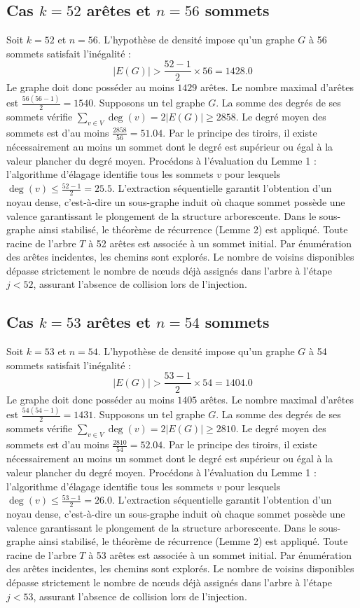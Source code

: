 \documentclass[12pt,a4paper]{article}
\begin{document}
\subsection{Cas $k = 52$ arêtes et $n = 56$ sommets}
Soit $k = 52$ et $n = 56$. L'hypothèse de densité impose qu'un graphe $G$ à 56 sommets satisfait l'inégalité :
$$ |E(G)| > \frac{52-1}{2} \times 56 = 1428.0 $$
Le graphe doit donc posséder au moins $1429$ arêtes. Le nombre maximal d'arêtes est $\frac{56(56-1)}{2} = 1540$.
Supposons un tel graphe $G$. La somme des degrés de ses sommets vérifie $\sum_{v \in V} \deg(v) = 2|E(G)| \geq 2858$.
Le degré moyen des sommets est d'au moins $\frac{2858}{56} = 51.04$.
Par le principe des tiroirs, il existe nécessairement au moins un sommet dont le degré est supérieur ou égal à la valeur plancher du degré moyen.
Procédons à l'évaluation du Lemme 1 : l'algorithme d'élagage identifie tous les sommets $v$ pour lesquels $\deg(v) \leq \frac{52-1}{2} = 25.5$.
L'extraction séquentielle garantit l'obtention d'un noyau dense, c'est-à-dire un sous-graphe induit où chaque sommet possède une valence garantissant le plongement de la structure arborescente.
Dans le sous-graphe ainsi stabilisé, le théorème de récurrence (Lemme 2) est appliqué. Toute racine de l'arbre $T$ à 52 arêtes est associée à un sommet initial. Par énumération des arêtes incidentes, les chemins sont explorés. Le nombre de voisins disponibles dépasse strictement le nombre de nœuds déjà assignés dans l'arbre à l'étape $j < 52$, assurant l'absence de collision lors de l'injection.

\subsection{Cas $k = 53$ arêtes et $n = 54$ sommets}
Soit $k = 53$ et $n = 54$. L'hypothèse de densité impose qu'un graphe $G$ à 54 sommets satisfait l'inégalité :
$$ |E(G)| > \frac{53-1}{2} \times 54 = 1404.0 $$
Le graphe doit donc posséder au moins $1405$ arêtes. Le nombre maximal d'arêtes est $\frac{54(54-1)}{2} = 1431$.
Supposons un tel graphe $G$. La somme des degrés de ses sommets vérifie $\sum_{v \in V} \deg(v) = 2|E(G)| \geq 2810$.
Le degré moyen des sommets est d'au moins $\frac{2810}{54} = 52.04$.
Par le principe des tiroirs, il existe nécessairement au moins un sommet dont le degré est supérieur ou égal à la valeur plancher du degré moyen.
Procédons à l'évaluation du Lemme 1 : l'algorithme d'élagage identifie tous les sommets $v$ pour lesquels $\deg(v) \leq \frac{53-1}{2} = 26.0$.
L'extraction séquentielle garantit l'obtention d'un noyau dense, c'est-à-dire un sous-graphe induit où chaque sommet possède une valence garantissant le plongement de la structure arborescente.
Dans le sous-graphe ainsi stabilisé, le théorème de récurrence (Lemme 2) est appliqué. Toute racine de l'arbre $T$ à 53 arêtes est associée à un sommet initial. Par énumération des arêtes incidentes, les chemins sont explorés. Le nombre de voisins disponibles dépasse strictement le nombre de nœuds déjà assignés dans l'arbre à l'étape $j < 53$, assurant l'absence de collision lors de l'injection.
\end{document}
